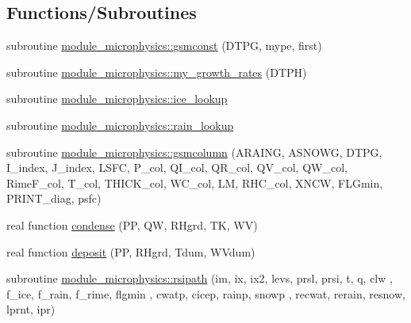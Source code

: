 \subsection*{Functions/\+Subroutines}
\begin{DoxyCompactItemize}
\item 
subroutine \hyperlink{namespacemodule__microphysics_ad5f89457c2cd2ba431b1c60d5ecbecc4}{module\+\_\+microphysics\+::gsmconst} (D\+T\+PG, mype, first)
\item 
subroutine \hyperlink{namespacemodule__microphysics_aa41d6b0b3b4eca4b41999d6c6aadb317}{module\+\_\+microphysics\+::my\+\_\+growth\+\_\+rates} (D\+T\+PH)
\item 
subroutine \hyperlink{namespacemodule__microphysics_a9273c6542f2e983e0f9040c80907b3c6}{module\+\_\+microphysics\+::ice\+\_\+lookup}
\item 
subroutine \hyperlink{namespacemodule__microphysics_a0090b42e85bd381e5459a9e8db9dc120}{module\+\_\+microphysics\+::rain\+\_\+lookup}
\item 
subroutine \hyperlink{namespacemodule__microphysics_a9874b115916d29a6688228ce0a5c2886}{module\+\_\+microphysics\+::gsmcolumn} (A\+R\+A\+I\+NG, A\+S\+N\+O\+WG, D\+T\+PG, I\+\_\+index, J\+\_\+index,           L\+S\+FC, P\+\_\+col, Q\+I\+\_\+col, Q\+R\+\_\+col, Q\+V\+\_\+col, Q\+W\+\_\+col, Rime\+F\+\_\+col, T\+\_\+col,       T\+H\+I\+C\+K\+\_\+col, W\+C\+\_\+col, LM, R\+H\+C\+\_\+col, X\+N\+CW, F\+L\+Gmin, P\+R\+I\+N\+T\+\_\+diag, psfc)
\item 
real function \hyperlink{module__bfmicrophysics_8f_ac3e5788798119e5db1749932012a1096}{condense} (PP, QW, R\+Hgrd, TK, WV)
\item 
real function \hyperlink{module__bfmicrophysics_8f_a3c00353fd3ab0fba51a524a05a5fc640}{deposit} (PP, R\+Hgrd, Tdum, W\+Vdum)
\item 
subroutine \hyperlink{namespacemodule__microphysics_a3e5e830e9ac0ef923bf65dda93abce33}{module\+\_\+microphysics\+::rsipath} (im, ix, ix2, levs, prsl, prsi, t, q, clw                   ,                                                               f\+\_\+ice, f\+\_\+rain, f\+\_\+rime, flgmin                                                               ,                                                               cwatp, cicep, rainp, snowp                                                                           ,                                                               recwat, rerain, resnow, lprnt, ipr)
\end{DoxyCompactItemize}
{\bf }\par
